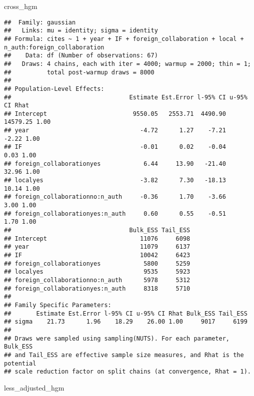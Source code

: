 \documentclass[
]{article}
\newenvironment{Shaded}{\begin{snugshade}}{\end{snugshade}}
\newcommand{\NormalTok}[1]{#1}
\begin{document}
\begin{Shaded}
\begin{Highlighting}[]
\NormalTok{cross\_hgm}
\end{Highlighting}
\end{Shaded}

\begin{verbatim}
##  Family: gaussian 
##   Links: mu = identity; sigma = identity 
## Formula: cites ~ 1 + year + IF + foreign_collaboration + local + n_auth:foreign_collaboration 
##    Data: df (Number of observations: 67) 
##   Draws: 4 chains, each with iter = 4000; warmup = 2000; thin = 1;
##          total post-warmup draws = 8000
## 
## Population-Level Effects: 
##                                 Estimate Est.Error l-95% CI u-95% CI Rhat
## Intercept                        9550.05   2553.71  4490.90 14579.25 1.00
## year                               -4.72      1.27    -7.21    -2.22 1.00
## IF                                 -0.01      0.02    -0.04     0.03 1.00
## foreign_collaborationyes            6.44     13.90   -21.40    32.96 1.00
## localyes                           -3.82      7.30   -18.13    10.14 1.00
## foreign_collaborationno:n_auth     -0.36      1.70    -3.66     3.00 1.00
## foreign_collaborationyes:n_auth     0.60      0.55    -0.51     1.70 1.00
##                                 Bulk_ESS Tail_ESS
## Intercept                          11076     6098
## year                               11079     6137
## IF                                 10042     6423
## foreign_collaborationyes            5800     5259
## localyes                            9535     5923
## foreign_collaborationno:n_auth      5978     5312
## foreign_collaborationyes:n_auth     8318     5710
## 
## Family Specific Parameters: 
##       Estimate Est.Error l-95% CI u-95% CI Rhat Bulk_ESS Tail_ESS
## sigma    21.73      1.96    18.29    26.00 1.00     9017     6199
## 
## Draws were sampled using sampling(NUTS). For each parameter, Bulk_ESS
## and Tail_ESS are effective sample size measures, and Rhat is the potential
## scale reduction factor on split chains (at convergence, Rhat = 1).
\end{verbatim}

\begin{Shaded}
\begin{Highlighting}[]
\NormalTok{less\_adjusted\_hgm}
\end{Highlighting}
\end{Shaded}
\end{document}
